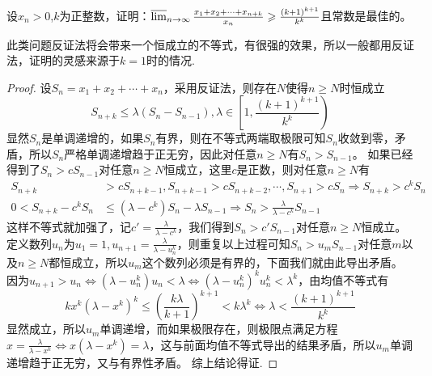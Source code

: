\documentclass[../../main.tex]{subfiles}
\begin{document}
\begin{example}
设\(x_n>0\),\(k\)为正整数，证明：\(\varlimsup_{n\rightarrow\infty}\frac{x_1 + x_2+\cdots + x_{n + k}}{x_n}\geqslant \frac{(k + 1)^{k + 1}}{k^k}\)且常数是最佳的。
\end{example}
\begin{note}
此类问题反证法将会带来一个恒成立的不等式，有很强的效果，所以一般都用反证法，证明的灵感来源于\(k = 1\)时的情况.
\end{note}
\begin{proof}
设\(S_n=x_1 + x_2+\cdots + x_n\)，采用反证法，则存在\(N\)使得\(n\geqslant  N\)时恒成立
\[S_{n + k}\leqslant \lambda(S_n - S_{n - 1}),\lambda\in\left[1,\frac{(k + 1)^{k + 1}}{k^k}\right)\]
显然\(S_n\)是单调递增的，如果\(S_n\)有界，则在不等式两端取极限可知\(S_n\)收敛到零，矛盾，所以\(S_n\)严格单调递增趋于正无穷，因此对任意\(n\geqslant  N\)有\(S_n>S_{n - 1}\)。
如果已经得到了\(S_n>cS_{n - 1}\)对任意\(n\geqslant  N\)恒成立，这里\(c\)是正数，则对任意\(n\geqslant  N\)有
\begin{align*}
S_{n + k}&>cS_{n + k - 1},S_{n + k - 1}>cS_{n + k - 2},\cdots,S_{n + 1}>cS_n\Rightarrow S_{n + k}>c^kS_n\\
0<S_{n + k}-c^kS_n&\leqslant (\lambda - c^k)S_n-\lambda S_{n - 1}\Rightarrow S_n>\frac{\lambda}{\lambda - c^k}S_{n - 1}
\end{align*}
这样不等式就加强了，记\(c'=\frac{\lambda}{\lambda - c^k}\)，我们得到\(S_n>c'S_{n - 1}\)对任意\(n\geqslant  N\)恒成立。
定义数列\(u_n\)为\(u_1 = 1,u_{n + 1}=\frac{\lambda}{\lambda - u_n^k}\)，则重复以上过程可知\(S_n>u_mS_{n - 1}\)对任意\(m\)以及\(n\geqslant  N\)都恒成立，所以\(u_m\)这个数列必须是有界的，下面我们就由此导出矛盾。
因为\(u_{n + 1}>u_n\Leftrightarrow(\lambda - u_n^k)u_n<\lambda\Leftrightarrow(\lambda - u_n^k)^ku_n^k<\lambda^k\)，由均值不等式有
\[kx^k(\lambda - x^k)^k\leqslant \left(\frac{k\lambda}{k + 1}\right)^{k + 1}<k\lambda^k\Leftrightarrow\lambda<\frac{(k + 1)^{k + 1}}{k^k}\]
显然成立，所以\(u_m\)单调递增，而如果极限存在，则极限点满足方程\(x=\frac{\lambda}{\lambda - x^k}\Leftrightarrow x(\lambda - x^k)=\lambda\)，这与前面均值不等式导出的结果矛盾，所以\(u_m\)单调递增趋于正无穷，又与有界性矛盾。
综上结论得证.
\end{proof}
\end{document}
